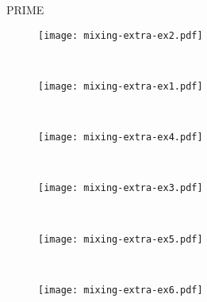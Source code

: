 \documentclass[runningheads]{llncs}
\begin{document}
\begin{figure}[!ht]
    \centering
    \footnotesize
    PRIME\\\vspace{3pt}
    \begin{subfigure}[t]{0.395\columnwidth}
        \centering
        \footnotesize
        \texttt{[image: mixing-extra-ex2.pdf]}
        \captionsetup{justification=centering}
        \vspace*{-4mm}
        \caption{ \\}
        \label{fig:add-mixing-examples:a1} 
    \end{subfigure}
    \begin{subfigure}[t]{0.395\columnwidth}
        \centering
        \footnotesize
        \texttt{[image: mixing-extra-ex1.pdf]}
        \captionsetup{justification=centering}
        \vspace*{-4mm}
        \caption{ \\}
        \label{fig:add-mixing-examples:b1} 
    \end{subfigure}
    \begin{subfigure}[t]{0.395\columnwidth}
        \centering
        \footnotesize
        \texttt{[image: mixing-extra-ex4.pdf]}
        \captionsetup{justification=centering}
        \vspace*{-4mm}
        \caption{ \\}
        \label{fig:add-mixing-examples:c1} 
    \end{subfigure}
    \begin{subfigure}[t]{0.395\columnwidth}
        \centering
        \footnotesize
        \texttt{[image: mixing-extra-ex3.pdf]}
        \captionsetup{justification=centering}
        \vspace*{-4mm}
        \caption{ \\}
        \label{fig:add-mixing-examples:d1} 
    \end{subfigure}
    \begin{subfigure}[t]{0.395\columnwidth}
        \centering
        \footnotesize
        \texttt{[image: mixing-extra-ex5.pdf]}
        \captionsetup{justification=centering}
        \vspace*{-4mm}
        \caption{ \\}
        \label{fig:add-mixing-examples:e1} 
    \end{subfigure}
    \begin{subfigure}[t]{0.395\columnwidth}
        \centering
        \footnotesize
        \texttt{[image: mixing-extra-ex6.pdf]}
        \captionsetup{justification=centering}
        \vspace*{-4mm}
        \caption{ \\}
        \label{fig:add-mixing-examples:f1} 
    \end{subfigure}
    

\end{figure}
\end{document}
